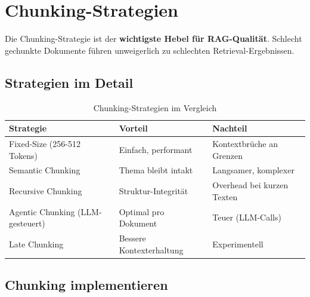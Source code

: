 \section{Chunking-Strategien}

Die Chunking-Strategie ist der \textbf{wichtigste Hebel für RAG-Qualität}. Schlecht gechunkte Dokumente führen unweigerlich zu schlechten Retrieval-Ergebnissen.

\subsection{Strategien im Detail}

\begin{table}[H]
\centering
\begin{tabularx}{\linewidth}{lXX}
\toprule
\textbf{Strategie} & \textbf{Vorteil} & \textbf{Nachteil} \\
\midrule
Fixed-Size (256-512 Tokens) & Einfach, performant & Kontextbrüche an Grenzen \\
Semantic Chunking & Thema bleibt intakt & Langsamer, komplexer \\
Recursive Chunking & Struktur-Integrität & Overhead bei kurzen Texten \\
Agentic Chunking (LLM-gesteuert) & Optimal pro Dokument & Teuer (LLM-Calls) \\
Late Chunking & Bessere Kontexterhaltung & Experimentell \\
\midrule
\end{tabularx}
\caption{Chunking-Strategien im Vergleich}
\label{tab:chunking}
\end{table}

\subsection{Chunking implementieren}

